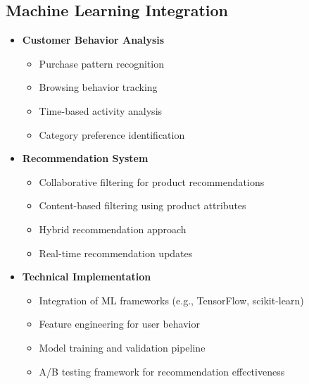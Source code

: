 \documentclass[12pt,a4paper]{article}
\begin{document}
\subsection{Machine Learning Integration}
\begin{itemize}
    \item \textbf{Customer Behavior Analysis}
    \begin{itemize}
        \item Purchase pattern recognition
        \item Browsing behavior tracking
        \item Time-based activity analysis
        \item Category preference identification
    \end{itemize}
    
    \item \textbf{Recommendation System}
    \begin{itemize}
        \item Collaborative filtering for product recommendations
        \item Content-based filtering using product attributes
        \item Hybrid recommendation approach
        \item Real-time recommendation updates
    \end{itemize}
    
    \item \textbf{Technical Implementation}
    \begin{itemize}
        \item Integration of ML frameworks (e.g., TensorFlow, scikit-learn)
        \item Feature engineering for user behavior
        \item Model training and validation pipeline
        \item A/B testing framework for recommendation effectiveness
    \end{itemize}
\end{itemize}
\end{document}
